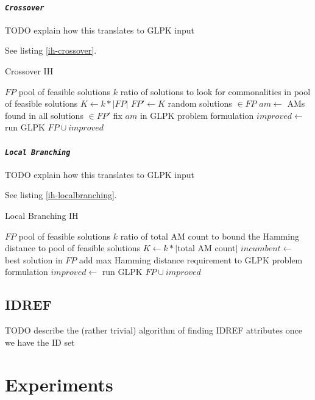 \documentclass[a4paper,12pt,oneside]{report}
\newcommand{\jmodule}[1]{\texttt{\textit{#1}}}
\theoremstyle{definition}
\begin{document}
\subsubsection{\jmodule{Crossover}}

TODO explain how this translates to GLPK input

See listing \ref{ih-crossover}.

\begin{algorithm}
\caption{Crossover IH}
\label{ih-crossover}
\begin{algorithmic}
\REQUIRE $FP$ pool of feasible solutions
\REQUIRE $k$ ratio of solutions to look for commonalities in
\ENSURE pool of feasible solutions
\STATE $K \gets k * |FP|$
\STATE $FP' \gets K$ random solutions $\in FP$
\STATE $am \gets$ AMs found in all solutions $\in FP'$
\STATE fix $am$ in GLPK problem formulation
\STATE $improved \gets $ run GLPK
\RETURN $FP \cup improved$
\end{algorithmic}
\end{algorithm}

\subsubsection{\jmodule{Local Branching}}

TODO explain how this translates to GLPK input

See listing \ref{ih-localbranching}.

\begin{algorithm}
\caption{Local Branching IH}
\label{ih-localbranching}
\begin{algorithmic}
\REQUIRE $FP$ pool of feasible solutions
\REQUIRE $k$ ratio of total AM count to bound the Hamming distance to
\ENSURE pool of feasible solutions
\STATE $K \gets k * |$total AM count$|$
\STATE $incumbent \gets $ best solution in $FP$ 
\STATE add max Hamming distance requirement to GLPK problem formulation
\STATE $improved \gets $ run GLPK
\RETURN $FP \cup improved$
\end{algorithmic}
\end{algorithm}

\section{IDREF}

TODO describe the (rather trivial) algorithm of finding IDREF attributes once we have the ID set

\chapter{Experiments}
\end{document}
